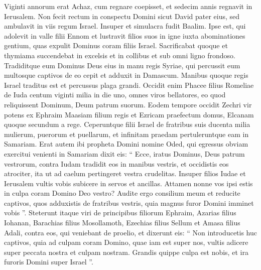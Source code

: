 \begin{biblechapter}
\begin{biblechapter}
\begin{biblechapter}
\begin{biblechapter}
\begin{biblechapter}
\begin{biblechapter}
\begin{biblechapter}
\begin{biblechapter}
\begin{biblechapter}
\begin{biblechapter}
\begin{biblechapter}
\begin{biblechapter}
\begin{biblechapter}
\begin{biblechapter}
\begin{biblechapter}
\begin{biblechapter}
\begin{biblechapter}
\begin{biblechapter}
\begin{biblechapter}
\begin{biblechapter}
\begin{biblechapter}
\begin{biblechapter}
\begin{biblechapter}
\begin{biblechapter}
\begin{biblechapter}
\begin{biblechapter}
\begin{biblechapter}
\begin{biblechapter}
\verse Viginti annorum erat Achaz, cum regnare coepisset, et sedecim annis regnavit in Ierusalem. Non fecit rectum in conspectu Domini sicut David pater eius, 
\verse sed ambulavit in viis regum Israel. Insuper et simulacra fudit Baalim. 
\verse Ipse est, qui adolevit in valle filii Ennom et lustravit filios suos in igne iuxta abominationes gentium, quas expulit Dominus coram filiis Israel. 
\verse Sacrificabat quoque et thymiama succendebat in excelsis et in collibus et sub omni ligno frondoso.
 \verse Tradiditque eum Dominus Deus eius in manu regis Syriae, qui percussit eum multosque captivos de eo cepit et adduxit in Damascum. Manibus quoque regis Israel traditus est et percussus plaga grandi. 
\verse Occidit enim Phacee filius Romeliae de Iuda centum viginti milia in die uno, omnes viros bellatores, eo quod reliquissent Dominum, Deum patrum suorum. 
\verse Eodem tempore occidit Zechri vir potens ex Ephraim Maasiam filium regis et Ezricam praefectum domus, Elcanam quoque secundum a rege. 
\verse Ceperuntque filii Israel de fratribus suis ducenta milia mulierum, puerorum et puellarum, et infinitam praedam pertuleruntque eam in Samariam.
 \verse Erat autem ibi propheta Domini nomine Oded, qui egressus obviam exercitui venienti in Samariam dixit eis: “ Ecce, iratus Dominus, Deus patrum vestrorum, contra Iudam tradidit eos in manibus vestris, et occidistis eos atrociter, ita ut ad caelum pertingeret vestra crudelitas. 
\verse Insuper filios Iudae et Ierusalem vultis vobis subicere in servos et ancillas. Attamen nonne vos ipsi estis in culpa coram Domino Deo vestro? 
\verse Audite ergo consilium meum et reducite captivos, quos adduxistis de fratribus vestris, quia magnus furor Domini imminet vobis ”. 
\verse Steterunt itaque viri de principibus filiorum Ephraim, Azarias filius Iohanan, Barachias filius Mosollamoth, Ezechias filius Sellum et Amasa filius Adali, contra eos, qui veniebant de proelio, 
\verse et dixerunt eis: “ Non introducetis huc captivos, quia ad culpam coram Domino, quae iam est super nos, vultis adicere super peccata nostra et culpam nostram. Grandis quippe culpa est nobis, et ira furoris Domini super Israel ”.

\end{biblechapter}
\end{biblechapter}
\end{biblechapter}
\end{biblechapter}
\end{biblechapter}
\end{biblechapter}
\end{biblechapter}
\end{biblechapter}
\end{biblechapter}
\end{biblechapter}
\end{biblechapter}
\end{biblechapter}
\end{biblechapter}
\end{biblechapter}
\end{biblechapter}
\end{biblechapter}
\end{biblechapter}
\end{biblechapter}
\end{biblechapter}
\end{biblechapter}
\end{biblechapter}
\end{biblechapter}
\end{biblechapter}
\end{biblechapter}
\end{biblechapter}
\end{biblechapter}
\end{biblechapter}
\end{biblechapter}
